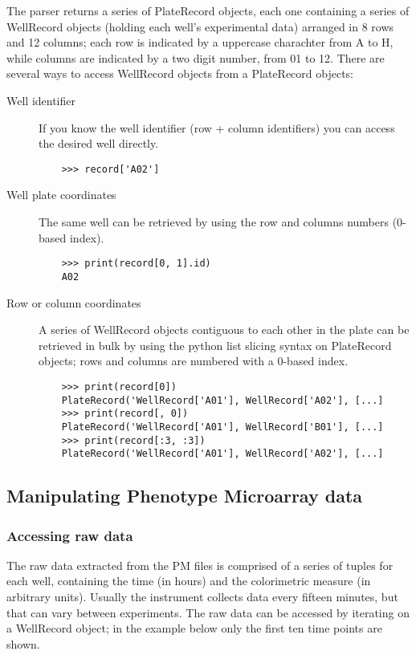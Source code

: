 The parser returns a series of PlateRecord objects, each one containing a series of WellRecord objects
(holding each well's experimental data) arranged in 8 rows and 12 columns; each row is indicated by
a uppercase charachter from A to H, while columns are indicated by a two digit number, from 01 to 12.
There are several ways to access WellRecord objects from a PlateRecord objects:

\begin{description}
  \item[Well identifier]
    If you know the well identifier (row + column identifiers) you can access the desired well directly.
    \begin{verbatim}
    >>> record['A02']
    \end{verbatim}

  \item[Well plate coordinates]
    The same well can be retrieved by using the row and columns numbers (0-based index).
    \begin{verbatim}
    >>> print(record[0, 1].id)
    A02
    \end{verbatim}

  \item[Row or column coordinates]
    A series of WellRecord objects contiguous to each other in the plate can be retrieved in bulk by
    using the python list slicing syntax on PlateRecord objects; rows and columns are numbered with
    a 0-based index.
    \begin{verbatim}
    >>> print(record[0])
    PlateRecord('WellRecord['A01'], WellRecord['A02'], [...]
    >>> print(record[, 0])
    PlateRecord('WellRecord['A01'], WellRecord['B01'], [...]
    >>> print(record[:3, :3])
    PlateRecord('WellRecord['A01'], WellRecord['A02'], [...]
    \end{verbatim}

\end{description} 

\subsection{Manipulating Phenotype Microarray data}

\subsubsection{Accessing raw data}
The raw data extracted from the PM files is comprised of a series of tuples for each well,
containing the time (in hours) and the colorimetric measure (in arbitrary units).
Usually the instrument collects data every fifteen minutes, but that can vary between
experiments. The raw data can be accessed by iterating on a WellRecord object;
in the example below only the first ten time points are shown. 

